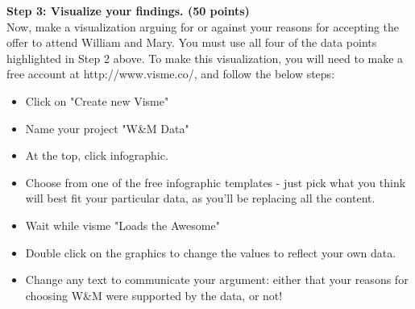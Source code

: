 \documentclass{article}
\begin{document}
\vspace{3mm}
\textbf{Step 3: Visualize your findings. (50 points)}\\
Now, make a visualization arguing for or against your reasons for accepting the offer to attend William and Mary.  You must use all four of the data points highlighted in Step 2 above.  To make this visualization, you will need to make a free account at http://www.visme.co/, and follow the below steps:
\begin{itemize}
\item Click on "Create new Visme"
\item Name your project "W\&M Data"
\item At the top, click infographic.
\item Choose from one of the free infographic templates - just pick what you think will best fit your particular data, as you'll be replacing all the content.
\item Wait while visme "Loads the Awesome"
\item Double click on the graphics to change the values to reflect your own data.
\item Change any text to communicate your argument: either that your reasons for choosing W\&M were supported by the data, or not!
\end{itemize}
\vspace{3mm}
\end{document}

